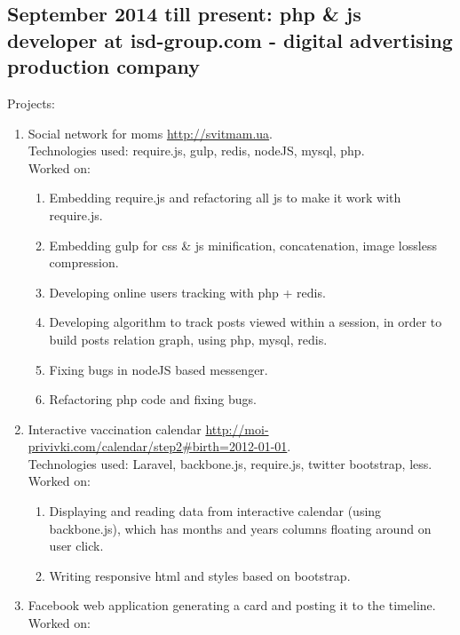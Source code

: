 \documentclass[a4paper, 14pt]{article}
\begin{document}
	\subsection{September 2014 till present: php \& js developer at isd-group.com - digital advertising production company}
    Projects:
    \begin{enumerate}
        \item Social network for moms \url{http://svitmam.ua}. \\
            Technologies used: require.js, gulp, redis, nodeJS, mysql, php. \\
            Worked on: 
            \begin{enumerate}
                \item Embedding require.js and refactoring all js to make it work with require.js.
                \item Embedding gulp for css \& js minification, concatenation, image lossless compression. 
                \item Developing online users tracking with php + redis.
                \item Developing algorithm to track posts viewed within a session, in order to build posts relation graph, using php, mysql, redis.
                \item Fixing bugs in nodeJS based messenger.
                \item Refactoring php code and fixing bugs.
            \end{enumerate}
        \item Interactive vaccination calendar \url{http://moi-privivki.com/calendar/step2#birth=2012-01-01}. \\
            Technologies used: Laravel, backbone.js, require.js, twitter bootstrap, less. \\
            Worked on:
            \begin{enumerate}
                \item Displaying and reading data from interactive calendar (using backbone.js), which has months and years columns floating around on user click.
                \item Writing responsive html and styles based on bootstrap.
            \end{enumerate}
        \item Facebook web application generating a card and posting it to the timeline.
            Worked on:
            \begin{enumerate}

\end{enumerate}
\end{enumerate}
\end{document}
